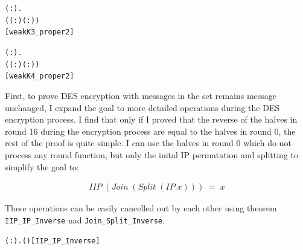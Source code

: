 \documentclass{article}
\begin{document}
\begin{alltt}
\HOLTokenTurnstile{} \HOLSymConst{\HOLTokenForall{}}( :).
      \HOLSymConst{\HOLTokenIn{}}  \HOLSymConst{\HOLTokenConj{}}
       \HOLSymConst{=}
     (( : \HOLTokenMap{} )\HOLSymConst{,}( : \HOLTokenMap{} )) \HOLSymConst{\HOLTokenImp{}}
       \HOLSymConst{=} \hfill{[weakK3_proper2]}
\end{alltt}

\begin{alltt}
\HOLTokenTurnstile{} \HOLSymConst{\HOLTokenForall{}}( :).
      \HOLSymConst{\HOLTokenIn{}}  \HOLSymConst{\HOLTokenConj{}}
       \HOLSymConst{=}
     (( : \HOLTokenMap{} )\HOLSymConst{,}( : \HOLTokenMap{} )) \HOLSymConst{\HOLTokenImp{}}
       \HOLSymConst{=} \hfill{[weakK4_proper2]}
\end{alltt}

First, to prove DES encryption with messages in the set remains message unchanged, I expand the goal to more detailed operations
during the DES encryption process. I find that only
if I proved that the reverse of the halves in round 16 during the encryption process are equal to the halves in round 0,
the rest of the proof is
quite simple. I can use the halves in round 0 which do not process any round function, but only the inital IP permutation
and splitting to simplify the goal to:

\begin{equation*}
\begin{split}
 IIP \; (Join \; (Split \; (IP \; x))) \; = \; x
\end{split}
\end{equation*}

These operations can be easily cancelled out by each other using theorem \verb|IIP_IP_Inverse| nad \verb|Join_Split_Inverse|.

\begin{alltt}
\HOLTokenTurnstile{} \HOLSymConst{\HOLTokenForall{}}( :).  ( ) \HOLSymConst{=} \hfill{[IIP_IP_Inverse]}
\end{alltt}
\end{document}
